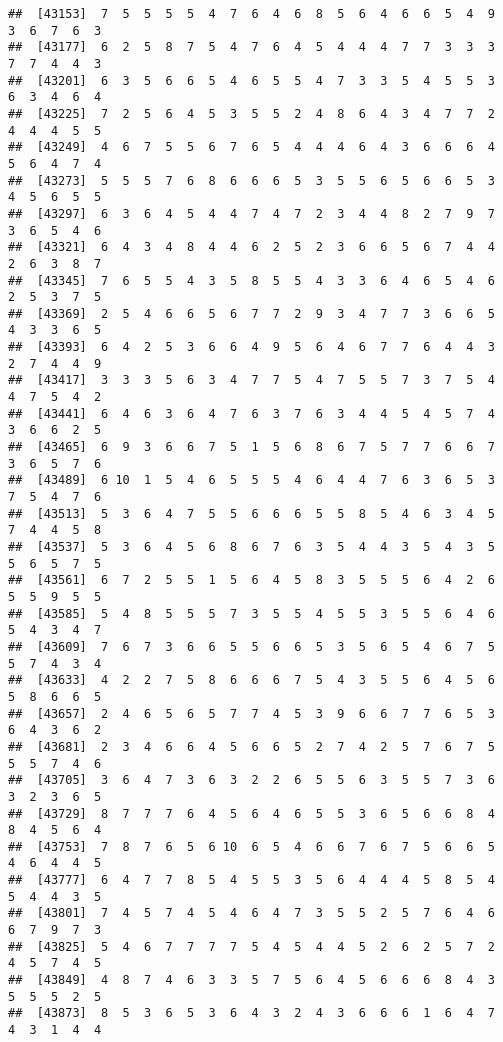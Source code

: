 \documentclass[
]{book}
\begin{document}
\begin{verbatim}
##  [43153]  7  5  5  5  5  4  7  6  4  6  8  5  6  4  6  6  5  4  9  3  6  7  6  3
##  [43177]  6  2  5  8  7  5  4  7  6  4  5  4  4  4  7  7  3  3  3  7  7  4  4  3
##  [43201]  6  3  5  6  6  5  4  6  5  5  4  7  3  3  5  4  5  5  3  6  3  4  6  4
##  [43225]  7  2  5  6  4  5  3  5  5  2  4  8  6  4  3  4  7  7  2  4  4  4  5  5
##  [43249]  4  6  7  5  5  6  7  6  5  4  4  4  6  4  3  6  6  6  4  5  6  4  7  4
##  [43273]  5  5  5  7  6  8  6  6  6  5  3  5  5  6  5  6  6  5  3  4  5  6  5  5
##  [43297]  6  3  6  4  5  4  4  7  4  7  2  3  4  4  8  2  7  9  7  3  6  5  4  6
##  [43321]  6  4  3  4  8  4  4  6  2  5  2  3  6  6  5  6  7  4  4  2  6  3  8  7
##  [43345]  7  6  5  5  4  3  5  8  5  5  4  3  3  6  4  6  5  4  6  2  5  3  7  5
##  [43369]  2  5  4  6  6  5  6  7  7  2  9  3  4  7  7  3  6  6  5  4  3  3  6  5
##  [43393]  6  4  2  5  3  6  6  4  9  5  6  4  6  7  7  6  4  4  3  2  7  4  4  9
##  [43417]  3  3  3  5  6  3  4  7  7  5  4  7  5  5  7  3  7  5  4  4  7  5  4  2
##  [43441]  6  4  6  3  6  4  7  6  3  7  6  3  4  4  5  4  5  7  4  3  6  6  2  5
##  [43465]  6  9  3  6  6  7  5  1  5  6  8  6  7  5  7  7  6  6  7  3  6  5  7  6
##  [43489]  6 10  1  5  4  6  5  5  5  4  6  4  4  7  6  3  6  5  3  7  5  4  7  6
##  [43513]  5  3  6  4  7  5  5  6  6  6  5  5  8  5  4  6  3  4  5  7  4  4  5  8
##  [43537]  5  3  6  4  5  6  8  6  7  6  3  5  4  4  3  5  4  3  5  5  6  5  7  5
##  [43561]  6  7  2  5  5  1  5  6  4  5  8  3  5  5  5  6  4  2  6  5  5  9  5  5
##  [43585]  5  4  8  5  5  5  7  3  5  5  4  5  5  3  5  5  6  4  6  5  4  3  4  7
##  [43609]  7  6  7  3  6  6  5  5  6  6  5  3  5  6  5  4  6  7  5  5  7  4  3  4
##  [43633]  4  2  2  7  5  8  6  6  6  7  5  4  3  5  5  6  4  5  6  5  8  6  6  5
##  [43657]  2  4  6  5  6  5  7  7  4  5  3  9  6  6  7  7  6  5  3  6  4  3  6  2
##  [43681]  2  3  4  6  6  4  5  6  6  5  2  7  4  2  5  7  6  7  5  5  5  7  4  6
##  [43705]  3  6  4  7  3  6  3  2  2  6  5  5  6  3  5  5  7  3  6  3  2  3  6  5
##  [43729]  8  7  7  7  6  4  5  6  4  6  5  5  3  6  5  6  6  8  4  8  4  5  6  4
##  [43753]  7  8  7  6  5  6 10  6  5  4  6  6  7  6  7  5  6  6  5  4  6  4  4  5
##  [43777]  6  4  7  7  8  5  4  5  5  3  5  6  4  4  4  5  8  5  4  5  4  4  3  5
##  [43801]  7  4  5  7  4  5  4  6  4  7  3  5  5  2  5  7  6  4  6  6  7  9  7  3
##  [43825]  5  4  6  7  7  7  7  5  4  5  4  4  5  2  6  2  5  7  2  4  5  7  4  5
##  [43849]  4  8  7  4  6  3  3  5  7  5  6  4  5  6  6  6  8  4  3  5  5  5  2  5
##  [43873]  8  5  3  6  5  3  6  4  3  2  4  3  6  6  6  1  6  4  7  4  3  1  4  4

\end{verbatim}
\end{document}
